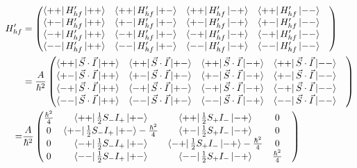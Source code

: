 \documentclass[10pt]{article} %
\begin{document}
\begin{align*}
  H_{hf}' &=
  \begin{pmatrix}
    \bra{++}H_{hf}'\ket{++} &
    \bra{++}H_{hf}'\ket{+-} &
    \bra{++}H_{hf}'\ket{-+} &
    \bra{++}H_{hf}'\ket{--} &\\
    \bra{+-}H_{hf}'\ket{++} &
    \bra{+-}H_{hf}'\ket{+-} &
    \bra{+-}H_{hf}'\ket{-+} &
    \bra{+-}H_{hf}'\ket{--} &\\
    \bra{-+}H_{hf}'\ket{++} &
    \bra{-+}H_{hf}'\ket{+-} &
    \bra{-+}H_{hf}'\ket{-+} &
    \bra{-+}H_{hf}'\ket{--} &\\
    \bra{--}H_{hf}'\ket{++} &
    \bra{--}H_{hf}'\ket{+-} &
    \bra{--}H_{hf}'\ket{-+} &
    \bra{--}H_{hf}'\ket{--} &\\
  \end{pmatrix}\\
  &=
  \frac{A}{\hbar^2}
  \begin{pmatrix}
    \bra{++}\vec{S}\cdot\vec{I}\ket{++} &
    \bra{++}\vec{S}\cdot\vec{I}\ket{+-} &
    \bra{++}\vec{S}\cdot\vec{I}\ket{-+} &
    \bra{++}\vec{S}\cdot\vec{I}\ket{--} &\\
    \bra{+-}\vec{S}\cdot\vec{I}\ket{++} &
    \bra{+-}\vec{S}\cdot\vec{I}\ket{+-} &
    \bra{+-}\vec{S}\cdot\vec{I}\ket{-+} &
    \bra{+-}\vec{S}\cdot\vec{I}\ket{--} &\\
    \bra{-+}\vec{S}\cdot\vec{I}\ket{++} &
    \bra{-+}\vec{S}\cdot\vec{I}\ket{+-} &
    \bra{-+}\vec{S}\cdot\vec{I}\ket{-+} &
    \bra{-+}\vec{S}\cdot\vec{I}\ket{--} &\\
    \bra{--}\vec{S}\cdot\vec{I}\ket{++} &
    \bra{--}\vec{S}\cdot\vec{I}\ket{+-} &
    \bra{--}\vec{S}\cdot\vec{I}\ket{-+} &
    \bra{--}\vec{S}\cdot\vec{I}\ket{--} &\\
  \end{pmatrix}\\
   = & \frac{A}{\hbar^2}
  \begin{pmatrix}
    \frac{\hbar^2}{4}&
    \bra{++}\frac{1}{2}S_-I_+\ket{+-}&
    \bra{++}\frac{1}{2}S_+I_-\ket{-+}&
    0&\\
    0&
    \bra{+-}\frac{1}{2}S_-I_+\ket{+-} - \frac{\hbar^2}{4}&
    \bra{+-}\frac{1}{2}S_+I_-\ket{-+}&
    0&\\
    0&
    \bra{-+}\frac{1}{2}S_-I_+\ket{+-}&
    \bra{-+}\frac{1}{2}S_+I_-\ket{-+} - \frac{\hbar^2}{4}&
    0&\\
    0&
    \bra{--}\frac{1}{2}S_-I_+\ket{+-}&
    \bra{--}\frac{1}{2}S_+I_-\ket{-+}&
    \frac{\hbar^2}{4} &\\
  \end{pmatrix}\\

\end{align*}
\end{document}
